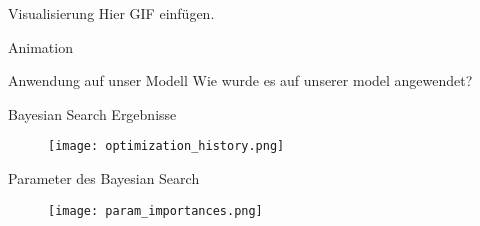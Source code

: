 \begin{frame}{Visualisierung}
    Hier GIF einfügen.
\end{frame}

\begin{frame}{Animation}
\end{frame}


\begin{frame}[fragile]{Anwendung auf unser Modell}
Wie wurde es auf unserer model angewendet?
\end{frame}



\begin{frame}{Bayesian Search Ergebnisse}
    \begin{figure}
        \centering
        \texttt{[image: optimization\_history.png]}
    \end{figure}
\end{frame}


\begin{frame}{Parameter des Bayesian Search}
    \begin{figure}
        \centering
        \texttt{[image: param\_importances.png]}
    \end{figure}
\end{frame}